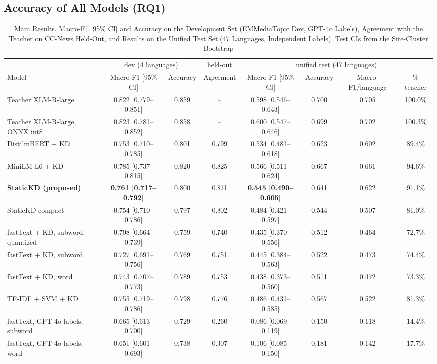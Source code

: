 \documentclass[journal]{IEEEtran}
\begin{document}
\subsection{Accuracy of All Models (RQ1)}
\label{sec:res-acc}
\begin{table}[!t]
\caption{Main Results. Macro-F1 [95\% CI] and Accuracy on the Development Set (EMMediaTopic Dev, GPT-4o Labels), Agreement with the Teacher on CC-News Held-Out, and Results on the Unified Test Set (47 Languages, Independent Labels). Test CIs from the Site-Cluster Bootstrap}
\label{tab:main}
\centering
\footnotesize
\setlength{\tabcolsep}{3.5pt}
\begin{tabular}{@{}lccccccc@{}}
\toprule
 & \multicolumn{2}{c}{dev (4 languages)} & held-out & \multicolumn{4}{c}{unified test (47 languages)} \\
\cmidrule(lr){2-3}\cmidrule(lr){4-4}\cmidrule(lr){5-8}
Model & Macro-F1 [95\% CI] & Accuracy & Agreement & Macro-F1 [95\% CI] & Accuracy & Macro-F1/language & \% teacher \\
\midrule
Teacher XLM-R-large & 0.822 [0.779--0.851] & 0.859 & -- & 0.598 [0.546--0.643] & 0.700 & 0.705 & 100.0\% \\
Teacher XLM-R-large, ONNX int8 & 0.823 [0.781--0.852] & 0.858 & -- & 0.600 [0.547--0.646] & 0.699 & 0.702 & 100.3\% \\
\midrule
DistilmBERT + KD & 0.753 [0.710--0.785] & 0.801 & 0.799 & 0.534 [0.481--0.618] & 0.623 & 0.602 & 89.4\% \\
MiniLM-L6 + KD & 0.785 [0.737--0.815] & 0.820 & 0.825 & 0.566 [0.511--0.624] & 0.667 & 0.661 & 94.6\% \\
\midrule
\textbf{StaticKD (proposed)} & \textbf{0.761 [0.717--0.792]} & 0.800 & 0.811 & \textbf{0.545 [0.490--0.605]} & 0.641 & 0.622 & 91.1\% \\
StaticKD-compact & 0.754 [0.710--0.786] & 0.797 & 0.802 & 0.484 [0.421--0.597] & 0.544 & 0.507 & 81.0\% \\
\midrule
fastText + KD, subword, quantized & 0.708 [0.664--0.739] & 0.759 & 0.740 & 0.435 [0.370--0.556] & 0.512 & 0.464 & 72.7\% \\
fastText + KD, subword & 0.727 [0.691--0.756] & 0.769 & 0.751 & 0.445 [0.384--0.563] & 0.522 & 0.473 & 74.4\% \\
fastText + KD, word & 0.743 [0.707--0.773] & 0.789 & 0.753 & 0.438 [0.373--0.560] & 0.511 & 0.472 & 73.3\% \\
TF-IDF + SVM + KD & 0.755 [0.719--0.786] & 0.798 & 0.776 & 0.486 [0.431--0.585] & 0.567 & 0.522 & 81.3\% \\
\midrule
fastText, GPT-4o labels, subword & 0.665 [0.613--0.700] & 0.729 & 0.260 & 0.086 [0.069--0.119] & 0.150 & 0.118 & 14.4\% \\
fastText, GPT-4o labels, word & 0.651 [0.601--0.693] & 0.738 & 0.307 & 0.106 [0.085--0.150] & 0.181 & 0.142 & 17.7\% \\
\bottomrule
\end{tabular}
\end{table}
\end{document}
